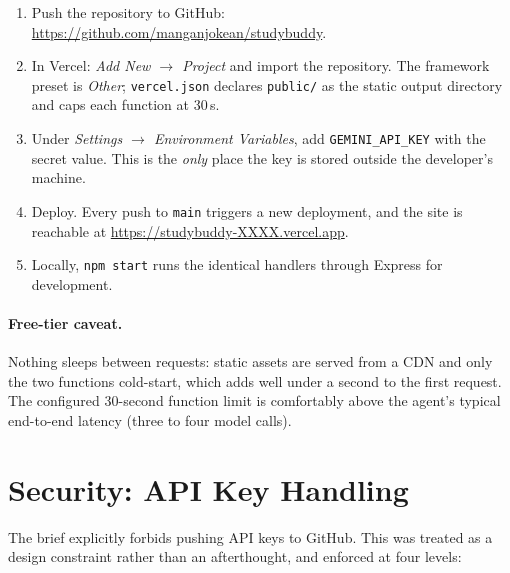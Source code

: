 \documentclass[11pt,a4paper]{article}
\newcommand{\appurl}{https://studybuddy-XXXX.vercel.app}
\newcommand{\repourl}{https://github.com/manganjokean/studybuddy}
\begin{document}
\begin{enumerate}[leftmargin=*]
  \item Push the repository to GitHub: \url{\repourl}.
  \item In Vercel: \emph{Add New $\rightarrow$ Project} and import the repository. The framework
        preset is \emph{Other}; \texttt{vercel.json} declares \texttt{public/} as the static
        output directory and caps each function at 30\,s.
  \item Under \emph{Settings $\rightarrow$ Environment Variables}, add \texttt{GEMINI\_API\_KEY}
        with the secret value. This is the \emph{only} place the key is stored outside the
        developer's machine.
  \item Deploy. Every push to \texttt{main} triggers a new deployment, and the site is reachable
        at \url{\appurl}.
  \item Locally, \texttt{npm start} runs the identical handlers through Express for development.
\end{enumerate}

\paragraph{Free-tier caveat.} Nothing sleeps between requests: static assets are served from a CDN
and only the two functions cold-start, which adds well under a second to the first request.
The configured 30-second function limit is comfortably above the agent's typical end-to-end
latency (three to four model calls).

\section{Security: API Key Handling}

The brief explicitly forbids pushing API keys to GitHub. This was treated as a design constraint
rather than an afterthought, and enforced at four levels:
\end{document}
